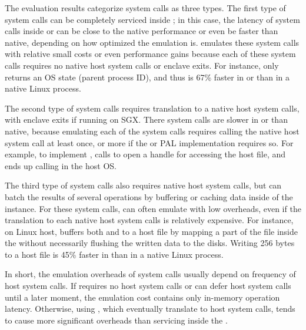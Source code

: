 The evaluation results categorize
system calls as three types.
The first type of system calls can be completely serviced inside \thelibos{};
in this case, the latency of system calls
inside \graphene{} or \graphenesgx{}
can be close to the native performance
or even be faster than native,
depending on how optimized the emulation is.
\graphene{} emulates
these system calls with relative small costs or even performance gains
because each of these system calls requires
no native host system calls
or enclave exits.
For instance,
 only returns an OS state
(parent process ID),
and thus is 67\% faster
in \graphene{} or \graphenesgx{}
than in a native Linux process.


The second type of system calls requires translation to a native host system calls,
with enclave exits if running on SGX.
There system calls are slower in \graphene{} or \graphenesgx{} than native,
because emulating each of the system calls
requires calling the native host system call at least once,
or more if the \thelibos{} or PAL implementation
requires so.
For example, to implement , \thelibos{} calls  to open a handle
for accessing the host file,
and ends up calling  in the host OS.


The third type of system calls also requires native host system calls, but \thelibos{} can batch
the results of several operations by buffering
or caching data inside of the \libos{} instance.
For these system calls,
\thelibos{} can often emulate with low overheads,
even if the translation to each native host system calls is relatively expensive.
For instance, on Linux host, \thelibos{} buffers both  and  to a host file
by mapping a part of the file inside the \picoproc{}
without necessarily flushing the written data to the disks.
Writing 256 bytes
to a host file is \roughly{}45\% faster in \graphene{} than in a native Linux process.  


In short,
the emulation overheads of system calls usually depend on frequency of host system calls.
If \thelibos{} requires no host system calls
or can defer host system calls
until a later moment, the emulation cost contains only in-memory operation latency.
Otherwise,
using \hostapis{}, which eventually translate to host system calls, tends to cause more significant
overheads than servicing inside the \libos{}.





